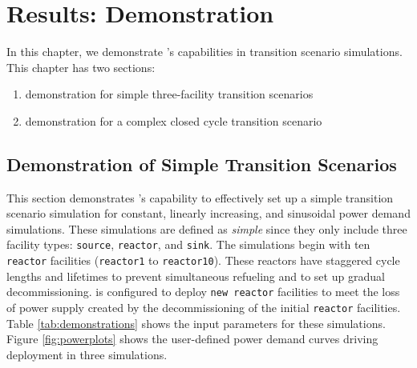 \chapter{Results: \deploy Demonstration}
In this chapter, we demonstrate \deploy's capabilities
in \Cyclus transition scenario simulations.  
This chapter has two sections: 
\begin{enumerate}
    \item \deploy demonstration for simple three-facility transition scenarios
    \item \deploy demonstration for a complex closed cycle transition scenario
\end{enumerate}

\section{\deploy Demonstration of Simple Transition Scenarios}
\label{sec:demo}

This section demonstrates \deploy's capability 
to effectively set up a simple transition scenario simulation 
for constant, linearly increasing, and 
sinusoidal power demand simulations.
These simulations are defined as \textit{simple} since 
they only include
three facility types: \texttt{source}, \texttt{reactor}, and 
\texttt{sink}. 
The simulations begin with ten \texttt{reactor} facilities 
(\texttt{reactor1} to \texttt{reactor10}). 
These reactors have staggered cycle lengths and lifetimes to prevent 
simultaneous refueling and to set up gradual decommissioning. 
\deploy is configured to deploy \texttt{new reactor} facilities
to meet the loss of power supply created by the decommissioning 
of the initial \texttt{reactor} facilities. 
Table \ref{tab:demonstrations} shows the 
\deploy input parameters for these simulations.
Figure \ref{fig:powerplots} shows the user-defined power demand curves 
driving deployment in three simulations. 

